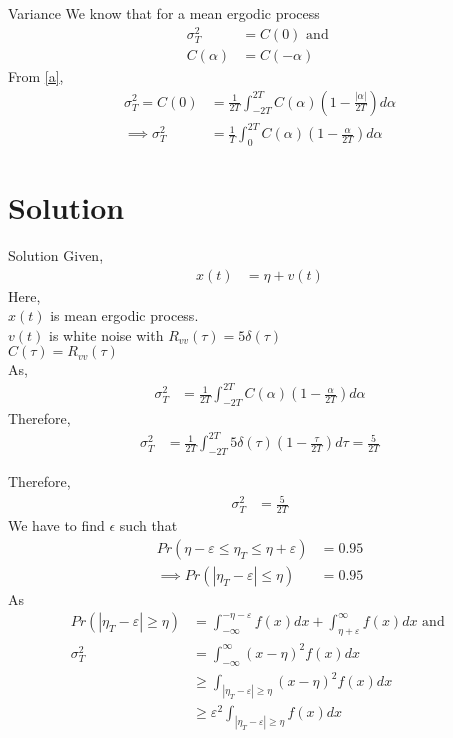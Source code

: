 \documentclass{beamer}
\begin{document}
\begin{frame}{Variance}
    We know that for a mean ergodic process
    \begin{align}
        \sigma_T^2&=C(0) \text{ and }\\
        C(\alpha) &=C(-\alpha)
    \end{align}
From \eqref{a},
\begin{align}
    \sigma_T^2=C(0)&= \frac{1}{2T}\int^{2T}_{-2T}C(\alpha)\left( 1-\frac{|\alpha|}{2T}\right)d\alpha\\
    \implies  \sigma_T^2&= \frac{1}{T}\int^{2T}_{0}C(\alpha)\left( 1-\frac{\alpha}{2T}\right)d\alpha
\end{align}
\end{frame}
\section{Solution}
\begin{frame}{Solution}
Given,\\
\begin{align}
    x(t) &= \eta +v(t)
\end{align}
Here,\\
$x(t)$ is mean ergodic process.\\
$v(t)$ is white noise with $R_{vv}(\tau)=5\delta(\tau)$\\
$C(\tau) = R_{vv}(\tau)$\\
As,
\begin{align}
    \sigma_{T}^2 &= \frac{1}{2T}\int_{-2T}^{2T} C(\alpha)\left(1-\frac{\alpha}{2T}\right)d\alpha
\end{align}
Therefore,\\
\begin{align}
    \sigma_T^2 &= \frac{1}{2T}\int_{-2T}^{2T} 5\delta(\tau)\left(1-\frac{\tau}{2T}\right)d\tau 
     =\frac{5}{2T}
\end{align}
\end{frame}
\begin{frame}{}
Therefore,
\begin{align}
    \sigma_T^2 &=\frac{5}{2T}
\end{align}
We have to find $\epsilon$ such that 
\begin{align}
    Pr(\eta - \varepsilon \leq \eta_T \leq \eta + \varepsilon) &= 0.95 \label{6}\\
    \implies Pr(|\eta_T-\varepsilon|\leq \eta) &= 0.95 \label{7}
\end{align}
As
\begin{align}
    Pr(|\eta_T-\varepsilon|\geq \eta) &= \int_{-\infty}^{-\eta-\varepsilon}f(x)dx+\int_{\eta + \varepsilon}^\infty f(x)dx \text{ and }\\
    \sigma_T^2 &= \int_{-\infty}^\infty (x-\eta)^2f(x)dx\\
    &\geq \int_{|\eta_T-\varepsilon|\geq \eta}(x-\eta)^2f(x)dx\\
    &\geq \varepsilon^2\int_{|\eta_T-\varepsilon|\geq \eta}f(x)dx
\end{align}
\end{frame}
\end{document}
